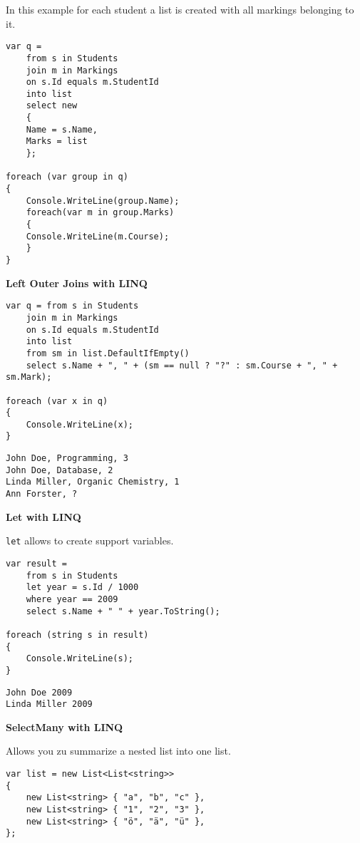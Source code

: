 \documentclass[11pt,twoside,landscape]{article}
\begin{document}
\begin{multicols}{3}
In this example for each student a list is created with all markings belonging to it.
\lstset{language=csharp,label= ,caption= ,captionpos=b,numbers=none}
\begin{lstlisting}
var q =
    from s in Students
    join m in Markings
    on s.Id equals m.StudentId
    into list
    select new
    {
	Name = s.Name,
	Marks = list
    };

foreach (var group in q)
{
    Console.WriteLine(group.Name);
    foreach(var m in group.Marks)
    {
	Console.WriteLine(m.Course);
    }
}
\end{lstlisting}

\textbf{Left Outer Joins with LINQ}

\lstset{language=csharp,label= ,caption= ,captionpos=b,numbers=none}
\begin{lstlisting}
var q = from s in Students
    join m in Markings
    on s.Id equals m.StudentId
    into list
    from sm in list.DefaultIfEmpty()
    select s.Name + ", " + (sm == null ? "?" : sm.Course + ", " + sm.Mark);

foreach (var x in q)
{
    Console.WriteLine(x);
}
\end{lstlisting}
\begin{verbatim}
John Doe, Programming, 3
John Doe, Database, 2
Linda Miller, Organic Chemistry, 1
Ann Forster, ?
\end{verbatim}

\textbf{Let with LINQ}

\texttt{let} allows to create support variables.

\lstset{language=csharp,label= ,caption= ,captionpos=b,numbers=none}
\begin{lstlisting}
var result =
    from s in Students
    let year = s.Id / 1000
    where year == 2009
    select s.Name + " " + year.ToString();

foreach (string s in result)
{
    Console.WriteLine(s);
}
\end{lstlisting}

\begin{verbatim}
John Doe 2009
Linda Miller 2009
\end{verbatim}

\textbf{SelectMany with LINQ}

Allows you zu summarize a nested list into one list.

\lstset{language=csharp,label= ,caption= ,captionpos=b,numbers=none}
\begin{lstlisting}
var list = new List<List<string>>
{
    new List<string> { "a", "b", "c" },
    new List<string> { "1", "2", "3" },
    new List<string> { "ö", "ä", "ü" },
};


\end{lstlisting}
\end{multicols}
\end{document}
